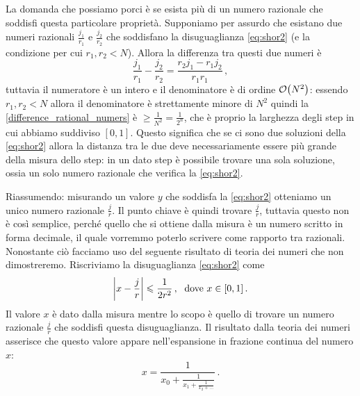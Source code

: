 \noindent La domanda che possiamo porci è se esista più di un numero razionale che soddisfi questa particolare proprietà. Supponiamo per assurdo che esistano due numeri razionali $\frac{j_1}{r_1}$ e $\frac{j_2}{r_2}$ che soddisfano la disuguaglianza \eqref{eq:shor2} (e la condizione per cui $r_1, r_2 < N$). Allora la differenza tra questi due numeri è
\begin{equation}\label{difference_rational_numers}
    \frac{j_1}{r_1} - \frac{j_2}{r_2} = \frac{r_2j_1-r_1j_2}{r_1r_1} \, ,
\end{equation}
tuttavia il numeratore è un intero e il denominatore è di ordine $\order{N^2}$: essendo $r_1, r_2 < N$ allora il denominatore è strettamente minore di $N^2$ quindi la \eqref{difference_rational_numers} è $\geqslant \frac 1{N^2} = \frac{1}{2^n}$, che è proprio la larghezza degli step in cui abbiamo suddiviso $[0,1]$. Questo significa che se ci sono due soluzioni della \eqref{eq:shor2} allora la distanza tra le due deve necessariamente essere più grande della misura dello step: in un dato step è possibile trovare una sola soluzione, ossia un solo numero razionale che verifica la \eqref{eq:shor2}.

\noindent Riassumendo: misurando un valore $y$ che soddisfa la \eqref{eq:shor2} otteniamo un unico numero razionale $\frac{j}{r}$. Il punto chiave è quindi trovare  $\frac jr$, tuttavia questo non è così semplice, perché quello che si ottiene dalla misura è un numero scritto in forma decimale, il quale vorremmo poterlo scrivere come rapporto tra razionali. Nonostante ciò facciamo uso del seguente risultato di teoria dei numeri che non dimostreremo. Riscriviamo la disuguaglianza \eqref{eq:shor2} come
\begin{equation*}
    \abs{x-\frac jr} \leqslant \frac 1{2r^2} \, , \; \text{ dove } x\in[0,1] \, .
\end{equation*}
Il valore $x$ è dato dalla misura mentre lo scopo è quello di trovare un numero razionale $\frac jr$ che soddisfi questa disuguaglianza. Il risultato dalla teoria dei numeri asserisce che questo valore appare nell'espansione in frazione continua del numero $x$:
\begin{equation*}
    x=\frac{1}{x_0+\frac{1}{x_1+\frac{1}{x_2+\ldots}}} \, .
\end{equation*}

